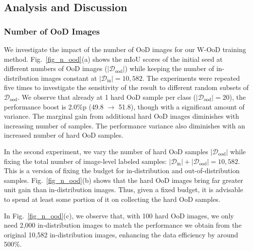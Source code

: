 \documentclass[10pt,twocolumn,letterpaper]{article}
\begin{document}
\vspace{-0.1em}
\subsection{Analysis and Discussion}\label{exp_discuss}
\vspace{-0.1em}
\subsubsection{Number of OoD Images}\label{analysis_num_ood_image}
\vspace{-0.3em}
We investigate the impact of the number of OoD images for our W-OoD training method. Fig.~\ref{fig_n_ood}(a) shows the mIoU scores of the initial seed at different numbers of OoD images ($|\mathcal{D}_\text{ood}|$) while keeping the number of in-distribution images constant at $|\mathcal{D}_\text{in}|=10,582$. 
The experiments were repeated five times to investigate the sensitivity of the result to different random subsets of $\mathcal{D}_\text{ood}$.
We observe that already at 1 hard OoD sample per class ($|\mathcal{D}_\text{ood}|=20$), the performance boost is 2.0\%p (49.8 $\rightarrow$ 51.8), though with a significant amount of variance.
The marginal gain from additional hard OoD images diminishes with increasing number of samples.
The performance variance also diminishes with an increased number of hard OoD samples.


In the second experiment, we vary the number of hard OoD samples $|\mathcal{D}_\text{ood}|$ while fixing the total number of image-level labeled samples: $|\mathcal{D}_\text{in}| + |\mathcal{D}_\text{ood}| = 10,582$.
This is a version of fixing the budget for in-distribution and out-of-distribution samples.
Fig.~\ref{fig_n_ood}(b) shows that the hard OoD images  bring far greater unit gain than in-distribution images. Thus, given a fixed budget, it is advisable to spend at least some portion of it on collecting the hard OoD samples. 


In Fig.~\ref{fig_n_ood}(c), we observe that, with 100 hard OoD images, we only need 2,000 in-distribution images to match the performance we obtain from the original 10,582 in-distribution images, enhancing the data efficiency by around 500\%.










\vspace{-0.7em}
\end{document}
